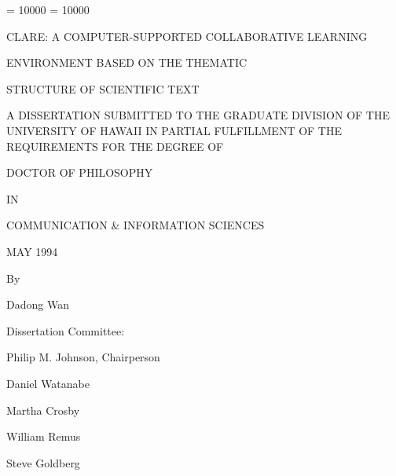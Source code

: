 
\clubpenalty = 10000    
\widowpenalty = 10000
\sloppy
\thispagestyle{empty}

\par\vspace*{0.00in}

\begin{center}
  CLARE: A COMPUTER-SUPPORTED COLLABORATIVE LEARNING

  ENVIRONMENT BASED ON THE THEMATIC

  STRUCTURE OF SCIENTIFIC TEXT

\end{center}  

\vspace*{0.6in}

  \begin{center}  
  A DISSERTATION SUBMITTED TO THE GRADUATE DIVISION OF THE\\
  
  UNIVERSITY OF HAWAII IN PARTIAL FULFILLMENT OF THE\\
  
  REQUIREMENTS FOR THE DEGREE OF 
\end{center}

\begin{center}

  DOCTOR OF PHILOSOPHY

 IN

 COMMUNICATION \& INFORMATION SCIENCES

 MAY 1994


\vspace*{0.7in}
 
  By   
  
  \vspace{.2in}
  
  Dadong Wan

  \vspace{0.2in}
\end{center}  

\begin{center}
  Dissertation Committee:
  \vspace{0.2in}

  Philip M. Johnson, Chairperson

  Daniel Watanabe

  Martha Crosby

  William Remus

  Steve Goldberg

\end{center}  


